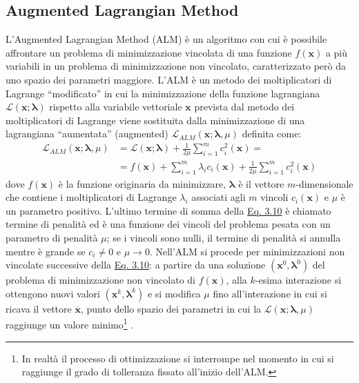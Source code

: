 \documentclass[12pt,a4paper,twoside]{report}
\newcommand{\vect}[1]{\boldsymbol{#1}}
\begin{document}
	\subsection{Augmented Lagrangian Method}
	L'Augmented Lagrangian Method (ALM) è un algoritmo con cui è possibile affrontare un problema di minimizzazione vincolata di una funzione $f\left(\vect{x}\right)$ a più variabili in un problema di minimizzazione non vincolato, caratterizzato però da uno spazio dei parametri maggiore. L'ALM è un metodo dei moltiplicatori di Lagrange ``modificato'' in cui la minimizzazione della funzione lagrangiana $\mathcal{L}\left(\vect{x};\vect{\lambda}\right)$ rispetto alla variabile vettoriale $\vect{x}$ prevista dal metodo dei moltiplicatori di Lagrange viene sostituita dalla minimizzazione di una lagrangiana ``aumentata'' (augmented) $\mathcal{L}_{ALM}\left(\vect{x};\vect{\lambda},\mu\right)$ definita come:
	\begin{equation}
		\begin{aligned}
			\mathcal{L}_{ALM}\left(\vect{x};\vect{\lambda},\mu\right)&=\mathcal{L}\left(\vect{x};\vect{\lambda}\right)+\frac{1}{2\mu}\sum_{i=1}^{m}c_i^2\left(\vect{x}\right)=\\
			&=f\left(\vect{x}\right)+\sum_{i=1}^{m}\lambda_ic_i\left(\vect{x}\right)+\frac{1}{2\mu}\sum_{i=1}^{m}c_i^2\left(\vect{x}\right)
		\end{aligned}
		\label{eq:augmented_lagrangian_funct}
	\end{equation}
	dove $f\left(\vect{x}\right)$ è la funzione originaria da minimizzare, $\vect{\lambda}$ è il vettore $m$-dimensionale che contiene i moltiplicatori di Lagrange $\lambda_i$ associati agli $m$ vincoli $c_i\left(\vect{x}\right)$ e $\mu$ è un parametro positivo. L'ultimo termine di somma della \hyperref[eq:augmented_lagrangian_funct]{Eq. 3.10} è chiamato termine di penalità ed è una funzione dei vincoli del problema pesata con un parametro di penalità $\mu$; se i vincoli sono nulli, il termine di penalità si annulla mentre è grande se $c_i\ne0$ e $\mu\rightarrow0$. Nell'ALM si procede per minimizzazioni non vincolate successive della \hyperref[eq:augmented_lagrangian_funct]{Eq. 3.10}: a partire da una soluzione $\left(\vect{x}^0,\vect{\lambda}^0\right)$ del problema di minimizzazione non vincolato di $f\left(\vect{x}\right)$, alla $k$-esima interazione si ottengono nuovi valori $\left(\vect{x}^k,\vect{\lambda}^k\right)$ e si modifica $\mu$ fino all'interazione in cui si ricava il vettore $\overline{\vect{x}}$, punto dello spazio dei parametri in cui la $\mathcal{L}\left(\vect{x};\vect{\lambda},\mu\right)$ raggiunge un valore minimo\footnote{In realtà il processo di ottimizzazione si interrompe nel momento in cui si raggiunge il grado di tolleranza fissato all'inizio dell'ALM.} \cite{Cho2016-st}.
	
\end{document}
